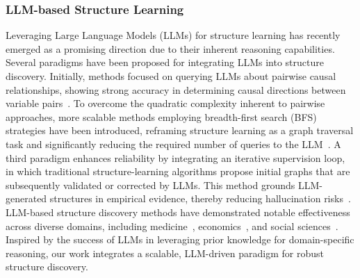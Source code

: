 \subsubsection{LLM-based Structure Learning}
Leveraging Large Language Models (LLMs) for structure learning has recently emerged as a promising direction due to their inherent reasoning capabilities. Several paradigms have been proposed for integrating LLMs into structure discovery. Initially, methods focused on querying LLMs about pairwise causal relationships, showing strong accuracy in determining causal directions between variable pairs~\cite{kiciman2023causal}. To overcome the quadratic complexity inherent to pairwise approaches, more scalable methods employing breadth-first search (BFS) strategies have been introduced, reframing structure learning as a graph traversal task and significantly reducing the required number of queries to the LLM~\cite{jiralerspong2024efficient, zanna2025fairness}. A third paradigm enhances reliability by integrating an iterative supervision loop, in which traditional structure-learning algorithms propose initial graphs that are subsequently validated or corrected by LLMs. This method grounds LLM-generated structures in empirical evidence, thereby reducing hallucination risks~\cite{ban2023causal}. LLM-based structure discovery methods have demonstrated notable effectiveness across diverse domains, including medicine~\cite{naik2024applying, antonucci2023zero, arsenyan2024large}, economics~\cite{causal4financial}, and social sciences~\cite{manning2024automated}. Inspired by the success of LLMs in leveraging prior knowledge for domain-specific reasoning, our work integrates a scalable, LLM-driven paradigm for robust structure discovery.



